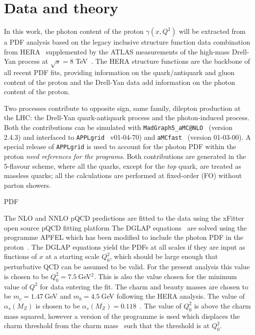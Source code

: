\section{Data and theory}
\label{sec:theory}

In this work, the photon
content of the proton $\gamma(x,Q^2)$ will be extracted from a PDF analysis based
on the legacy inclusive structure function data combination from HERA~\cite{Abramowicz:2015mha}
supplemented by the ATLAS measurements of the high-mass Drell-Yan process
at $\sqrt{s}=8$ TeV~\cite{Aad:2016zzw}.
%
The HERA structure functions are the backbone of all
recent PDF fits, providing information on the quark/antiquark and gluon content of 
the proton and the Drell-Yan data add information on the photon content of the proton.

Two processes contribute to opposite sign, same family, dilepton production at the LHC: 
the Drell-Yan quark-antiquark process and the photon-induced process. Both the contributions can be 
simulated with {\tt MadGraph5{\_}aMC@NLO}~\cite{Alwall:2014hca}
(version 2.4.3) and interfaced to {\tt APPLgrid}~\cite{Carli:2010rw}
v01-04-70) and {\tt aMCfast}~\cite{Carli:2010rw} (version 01-03-00).
%
A special release of {\tt APPLgrid} is used to account for the photon PDF within the proton {\it need references for the programs}.
Both contributions are generated in the 5-flavour scheme, where all the quarks, except for the \textit{top}
 quark, are treated as massless quarks; all the calculations are performed at fixed-order (FO) without 
 parton showers.


 PDF
 
The NLO and NNLO pQCD predictions are fitted to the data using the xFitter open source pQCD fitting platform
The DGLAP equations~\cite{dglap} are solved using the programme APFEL which has been modified to include 
the photon PDF in the proton~\cite{Bertone:2013vaa}.
%
The DGLAP equations yield the PDFs at all scales if they are input as finctions of $x$ at a starting scale $Q^2_0$, which 
should be large enough that perturbative QCD can be assumed to be valid. For the present analysis this value is chosen
to be $Q^2_0 = 7.5~$GeV$^2$.
%
This is also the value chosen for the minimum value of $Q^2$ for data entering the fit.
The charm and beauty masses are chosen to be $m_c=1.47~$GeV and $m_b=4.5~$GeV following the HERA analysis. 
The value of $\alpha_s(M_Z)$ is chosen to be $\alpha_s(M_Z)=0.118$~\cite{PDG}. 
The value of $Q^2_0$ is above the charm mass squared, however a version of the programme 
is used which displaces the charm threshold from the charm mass~\cite{charmthresh} such that the threshold is at $Q^2_0$.
 


